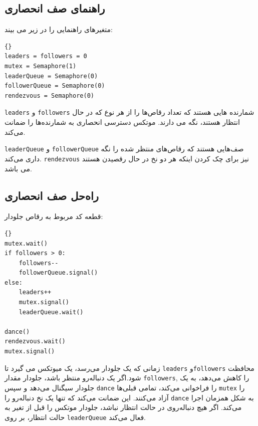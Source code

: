 \documentclass{book}
\newcommand{\clearemptydoublepage}{\newpage\cleardoublepage}
\begin{document}
\clearemptydoublepage
\subsection {راهنمای صف انحصاری}

متغیرهای راهنمایی را در زیر می بیند:

\begin{latin}
\begin{latin}
\begin{lstlisting}[title={Queue hint}]{}
leaders = followers = 0
mutex = Semaphore(1)
leaderQueue = Semaphore(0)
followerQueue = Semaphore(0)
rendezvous = Semaphore(0)
\end{lstlisting}
\end{latin}
\end{latin}

{\tt leaders} و {\tt followers} 
شمارنده هایی هستند که تعداد رقاص‌ها را از هر نوع که در حال انتظار هستند، نگه می دارند. موتکس دسترسی انحصاری به شمارنده‌ها را ضمانت می‌کند.

{\tt leaderQueue} و {\tt followerQueue}
صف‌هایی هستند که رقاص‌های منتظر شده را نگه داری می‌کند. {\tt rendezvous} نیز برای چک کردن اینکه هر دو نخ در حال رقصیدن هستند می باشد.



\clearemptydoublepage
\subsection {راه‌حل صف انحصاری}

قطعه کد مربوط به رقاص جلو‌دار:

\begin{latin}
\begin{latin}
\begin{lstlisting}[title={Queue solution (leaders)}]{}
mutex.wait()
if followers > 0:
    followers--
    followerQueue.signal()
else:
    leaders++
    mutex.signal()
    leaderQueue.wait()    

dance()
rendezvous.wait()
mutex.signal()
\end{lstlisting}
\end{latin}
\end{latin}

زمانی که یک جلو‌دار می‌رسد، یک میوتکس می گیرد تا {\tt leaders} و{\tt followers} محافظت شود.اگر یک دنباله‌رو منتظر باشد، جلو‌دار مقدار {\tt followers}, را کاهش می‌دهد،  به یک جلو‌دار سیگنال می‌دهد و سپس {\tt dance} را فراخوانی می‌کند، تمامی قبلی‌ها {\tt mutex} را آزاد می‌کنند. این ضمانت می‌کند که تنها یک نخ دنباله‌رو را {\tt dance} به شکل همزمان اجرا می‌کند.
اگر هیچ دنباله‌روی در حالت انتظار نباشد، جلو‌دار موتکس را قبل از تغیر به حالت انتظار، بر روی {\tt leaderQueue} فعال می‌کند.
\end{document}
